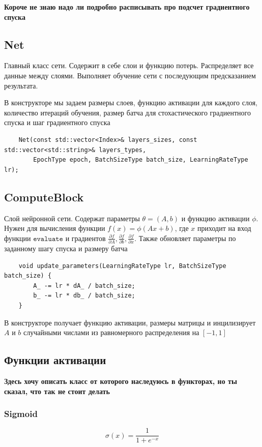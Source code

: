 \documentclass{article}
\begin{document}
\textbf{Короче не знаю надо ли подробно расписывать про подсчет градиентного спуска}

\subsection{Net}
Главный класс сети. Содержит в себе слои и функцию потерь. Распределяет все данные между слоями. Выполняет обучение сети с последующим предсказанием результата.

В конструкторе мы задаем размеры слоев, функцию активации для каждого слоя, количество итераций обучения, размер батча для стохастического градиентного спуска и шаг градиентного спуска
\begin{lstlisting}
    Net(const std::vector<Index>& layers_sizes, const std::vector<std::string>& layers_types,
        EpochType epoch, BatchSizeType batch_size, LearningRateType lr);
\end{lstlisting}

\subsection{ComputeBlock}
Слой нейронной сети. Содержат параметры $\theta = (A, b)$ и функцию активации $\phi$. Нужен для вычисления функции $f(x) = \phi(Ax + b)$, где $x$ приходит на вход функции $\texttt{evaluate}$ и градиентов $\frac{\partial f}{\partial A}, \frac{\partial f}{\partial b}, \frac{\partial f}{\partial x}$. Также обновляет параметры по заданному шагу спуска и размеру батча
\begin{lstlisting}
    void update_parameters(LearningRateType lr, BatchSizeType batch_size) {
        A_ -= lr * dA_ / batch_size;
        b_ -= lr * db_ / batch_size;
    }
\end{lstlisting}
В конструкторе получает функцию активации, размеры матрицы и инцилизирует $A$ и $b$ случайными числами из равномерного распределения на $[-1, 1]$

\subsection{Функции активации}
\textbf{Здесь хочу описать класс от которого наследуюсь в функторах, но ты сказал, что так не стоит делать}

\subsubsection{Sigmoid}
$$
\sigma(x) = \frac{1}{1 + e^{-x}}
$$
\end{document}
